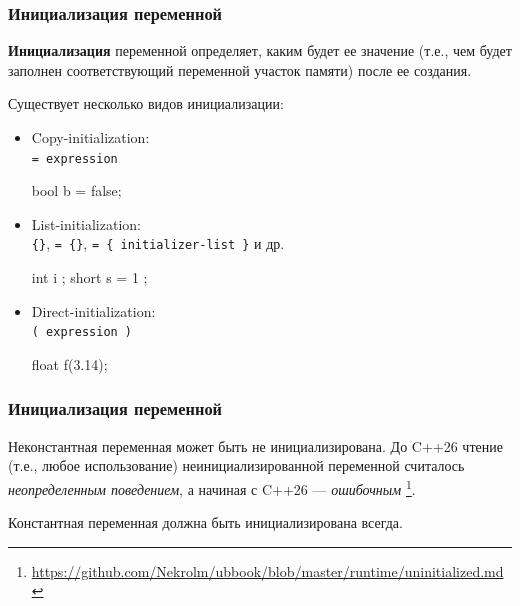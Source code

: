 \documentclass[compress, 8pt, aspectratio=169]{beamer}
\begin{document}
\begin{frame}[fragile]

    \frametitle{Инициализация переменной}

    \textbf{Инициализация} переменной определяет, каким будет ее значение
    (т.е., чем будет заполнен соответствующий переменной участок памяти)
    после ее создания.

    Существует несколько видов инициализации:

    \begin{itemize}

        \item Copy-initialization: \\ \verb|= expression|
            \begin{myinplacelisting}[minted language=cpp]
bool b = false;
            \end{myinplacelisting}

        \item List-initialization: \\
            \verb|{}|, \verb|= {}|, \verb|= { initializer-list }| и др.
            \begin{myinplacelisting}[minted language=cpp]
int i {};
short s = { 1 };
            \end{myinplacelisting}

        \item Direct-initialization: \\ \verb|( expression )|
            \begin{myinplacelisting}[minted language=cpp]
float f(3.14);
            \end{myinplacelisting}

    \end{itemize}

\end{frame}

\begin{frame}[fragile]

    \frametitle{Инициализация переменной}

    Неконстантная переменная может быть не инициализирована.
    До C++26 чтение (т.е., любое использование) неинициализированной переменной
    считалось \textit{неопределенным поведением}, а начиная с C++26 ---
    \textit{ошибочным}
    \footnote{\url{https://github.com/Nekrolm/ubbook/blob/master/runtime/uninitialized.md}}.

    \hfill \break
    Константная переменная должна быть инициализирована всегда.

\end{frame}
\end{document}
